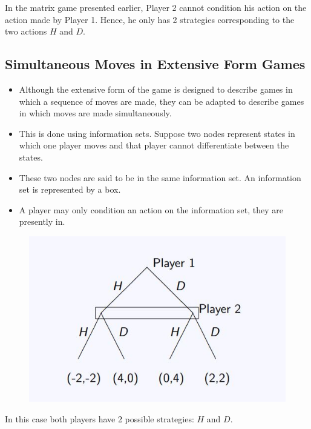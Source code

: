 \documentclass[]{report}
\begin{document}
In the matrix game presented earlier, Player 2 cannot condition his
action on the action made by Player 1. Hence, he only has 2
strategies corresponding to the two actions $H$ and $D$.

\subsection{Simultaneous Moves in Extensive Form Games}
\begin{itemize}
	\item Although the extensive form of the game is designed to describe
	games in which a sequence of moves are made, they can be
	adapted to describe games in which moves are made
	simultaneously.
	\item This is done using information sets. Suppose two nodes represent
	states in which one player moves and that player cannot
	differentiate between the states.
	\item These two nodes are said to be in the same information set. An
	information set is represented by a box.
	\item A player may only condition an action on the information set,
	they are presently in.
\end{itemize}




\begin{figure}[h!]
\centering
\includegraphics[width=0.55\linewidth]{images/DR5-Slide15}
\caption{}
\label{fig:DR5-Slide15}
\end{figure}
\noindent In this case both players have 2 possible strategies: $H$ and $D$.

\end{document}
